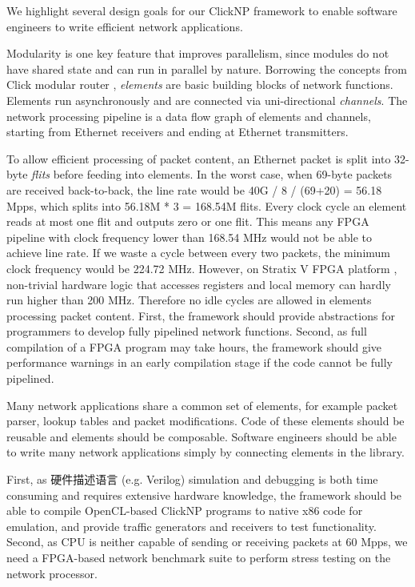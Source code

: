 {We highlight several design goals for our ClickNP framework to enable software engineers to write efficient network applications.

 Modularity is one key feature that improves parallelism, since modules do not have shared state and can run in parallel by nature. Borrowing the concepts from Click modular router \cite{kohler2000click}, \textit{elements} are basic building blocks of network functions. Elements run asynchronously and are connected via uni-directional \textit{channels}. The network processing pipeline is a data flow graph of elements and channels, starting from Ethernet receivers and ending at Ethernet transmitters.

 To allow efficient processing of packet content, an Ethernet packet is split into 32-byte \textit{flits} before feeding into elements. In the worst case, when 69-byte packets are received back-to-back, the line rate would be 40G / 8 / (69+20) = 56.18 Mpps, which splits into 56.18M * 3 = 168.54M flits. Every clock cycle an element reads at most one flit and outputs zero or one flit. This means any FPGA pipeline with clock frequency lower than 168.54 MHz would not be able to achieve line rate. If we waste a cycle between every two packets, the minimum clock frequency would be 224.72 MHz. However, on Stratix V FPGA platform \cite{stratix2012device}, non-trivial hardware logic that accesses registers and local memory can hardly run higher than 200 MHz. Therefore no idle cycles are allowed in elements processing packet content. First, the framework should provide abstractions for programmers to develop fully pipelined network functions. Second, as full compilation of a FPGA program may take hours, the framework should give performance warnings in an early compilation stage if the code cannot be fully pipelined.

 Many network applications share a common set of elements, for example packet parser, lookup tables and packet modifications. Code of these elements should be reusable and elements should be composable. Software engineers should be able to write many network applications simply by connecting elements in the library.

 First, as 硬件描述语言 (e.g. Verilog) simulation and debugging is both time consuming and requires extensive hardware knowledge, the framework should be able to compile OpenCL-based ClickNP programs to native x86 code for emulation, and provide traffic generators and receivers to test functionality. Second, as CPU is neither capable of sending or receiving packets at 60 Mpps, we need a FPGA-based network benchmark suite to perform stress testing on the network processor.

}
